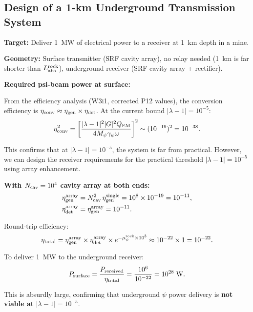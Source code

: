 \documentclass[aps,prd,twocolumn,superscriptaddress]{revtex4-2}
\newcommand{\Mpsi}{M_\psi}
\begin{document}
\subsection{Design of a 1-km Underground Transmission System}

\textbf{Target:} Deliver 1~MW of electrical power to a receiver at
1~km depth in a mine.

\textbf{Geometry:} Surface transmitter (SRF cavity array), no relay needed
(1~km is far shorter than $L_{\rm abs}^{\rm rock}$), underground receiver
(SRF cavity array + rectifier).

\textbf{Required psi-beam power at surface:}

From the efficiency analysis (W3i1, corrected P12 values), the
conversion efficiency is $\eta_{\rm conv} \approx \eta_{\rm gen}\times\eta_{\rm det}$.
At the current bound $|\lambda-1| = 10^{-5}$:
\begin{equation}
\eta_{\rm conv}^2 = \left[\frac{|\lambda-1|^2|G|^2 Q_{\rm EM}}
{4\Mpsi\gamma_\psi\omega}\right]^2 \sim (10^{-19})^2 = 10^{-38}.
\end{equation}

This confirms that at $|\lambda-1| = 10^{-5}$, the system is far from
practical.  However, we can design the receiver requirements for the
practical threshold $|\lambda-1| = 10^{-5}$ using array enhancement.

\textbf{With $N_{\rm cav} = 10^4$ cavity array at both ends:}
\begin{align}
\eta_{\rm gen}^{\rm array} &= N_{\rm cav}^2\,\eta_{\rm gen}^{\rm single}
= 10^8 \times 10^{-19} = 10^{-11}, \\
\eta_{\rm det}^{\rm array} &= \eta_{\rm gen}^{\rm array} = 10^{-11}.
\end{align}

Round-trip efficiency:
\begin{equation}
\eta_{\rm total} = \eta_{\rm gen}^{\rm array}\times\eta_{\rm det}^{\rm array}
\times e^{-\mu_\psi^{\rm rock} \times 10^3}
\approx 10^{-22} \times 1 = 10^{-22}.
\label{eq:eta-underground}
\end{equation}

To deliver 1~MW to the underground receiver:
\begin{equation}
P_{\rm surface} = \frac{P_{\rm received}}{\eta_{\rm total}}
= \frac{10^6}{10^{-22}} = 10^{28}\;\si{W}.
\label{eq:p-surface}
\end{equation}

This is absurdly large, confirming that underground $\psi$ power delivery
is \textbf{not viable at} $|\lambda-1| = 10^{-5}$.
\end{document}
